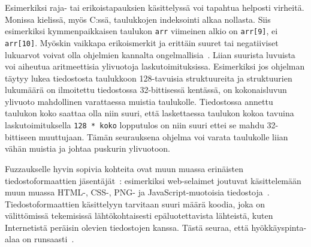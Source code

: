 Esimerkiksi raja- tai erikoistapauksien käsittelyssä voi tapahtua helposti virheitä.
Monissa kielissä, myös C:ssä,
taulukkojen indeksointi alkaa nollasta.
Siis esimerkiksi kymmenpaikkaisen taulukon \texttt{arr} viimeinen alkio on \texttt{arr[9]}, ei \texttt{arr[10]}.
Myöskin vaikkapa erikoismerkit ja erittäin suuret tai negatiiviset lukuarvot
voivat olla ohjelmien kannalta ongelmallisia~\cite{ViolatingAssumptions}.
Liian suurista luvuista voi aiheutua aritmeettisia ylivuotoja laskutoimituksissa.
Esimerkiksi jos ohjelman täytyy lukea tiedostosta taulukkoon 128-tavuisia struktuureita
ja struktuurien lukumäärä on ilmoitettu tiedostossa 32-bittisessä kentässä,
on kokonaisluvun ylivuoto mahdollinen varattaessa muistia taulukolle.
Tiedostossa annettu taulukon koko saattaa olla niin suuri,
että laskettaessa taulukon kokoa tavuina laskutoimituksella \texttt{128 * koko}
lopputulos on niin suuri ettei se mahdu 32-bittiseen muuttujaan.
Tämän seurauksena ohjelma voi varata taulukolle liian vähän muistia
ja johtaa puskurin ylivuotoon.

Fuzzaukselle hyvin sopivia kohteita ovat muun muassa erinäisten tiedostoformaattien jäsentäjät~\cite{SageArtikkeli,OuluBrowser}:
esimerkiksi web-selaimet joutuvat käsittelemään muun muassa
HTML-, CSS-, PNG- ja JavaScript-muotoisia tiedostoja~\cite{OuluBrowser}.
Tiedostoformaattien käsittelyyn tarvitaan suuri määrä koodia,
joka on välittömissä tekemisissä lähtökohtaisesti epäluotettavista lähteistä, kuten Internetistä peräisin olevien tiedostojen kanssa.
Tästä seuraa, että hyökkäyspinta-alaa on runsaasti~\cite{OuluBrowser}.

